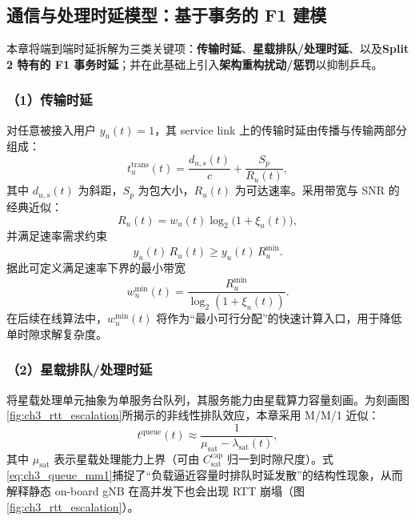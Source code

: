\documentclass[type=master]{fduthesis}
\begin{document}
\subsection{通信与处理时延模型：基于事务的 F1 建模}
\label{subsec:ch3_delay_model}

本章将端到端时延拆解为三类关键项：\textbf{传输时延}、\textbf{星载排队/处理时延}、以及\textbf{Split 2 特有的 F1 事务时延}；并在此基础上引入\textbf{架构重构扰动/惩罚}以抑制乒乓。

\subsubsection*{（1）传输时延}
对任意被接入用户 $y_u(t)=1$，其 service link 上的传输时延由传播与传输两部分组成：
\begin{equation}
t_{u}^{\mathrm{trans}}(t)
=
\frac{d_{u,s}(t)}{c}+\frac{S_p}{R_u(t)} ,
\label{eq:ch3_trans_delay}
\end{equation}
其中 $d_{u,s}(t)$ 为斜距，$S_p$ 为包大小，$R_u(t)$ 为可达速率。采用带宽与 SNR 的经典近似：
\begin{equation}
R_u(t)=w_u(t)\log_2\!\bigl(1+\xi_u(t)\bigr),
\label{eq:ch3_rate}
\end{equation}
并满足速率需求约束
\begin{equation}
y_u(t)\,R_u(t)\ge y_u(t)\,R_u^{\min}.
\label{eq:ch3_rate_constraint}
\end{equation}
据此可定义满足速率下界的最小带宽
\begin{equation}
w_u^{\min}(t)=\frac{R_u^{\min}}{\log_2(1+\xi_u(t))}.
\label{eq:ch3_wmin}
\end{equation}
在后续在线算法中，$w_u^{\min}(t)$ 将作为“最小可行分配”的快速计算入口，用于降低单时隙求解复杂度。

\subsubsection*{（2）星载排队/处理时延}
将星载处理单元抽象为单服务台队列，其服务能力由星载算力容量刻画。为刻画图\ref{fig:ch3_rtt_escalation}所揭示的非线性排队效应，本章采用 M/M/1 近似：
\begin{equation}
t^{\mathrm{queue}}(t)\approx \frac{1}{\mu_{\mathrm{sat}}-\lambda_{\mathrm{sat}}(t)},
\label{eq:ch3_queue_mm1}
\end{equation}
其中 $\mu_{\mathrm{sat}}$ 表示星载处理能力上界（可由 $C_{\mathrm{sat}}^{\mathrm{cap}}$ 归一到时隙尺度）。式\eqref{eq:ch3_queue_mm1}捕捉了“负载逼近容量时排队时延发散”的结构性现象，从而解释静态 on-board gNB 在高并发下也会出现 RTT 崩塌（图\ref{fig:ch3_rtt_escalation}）。
\end{document}
